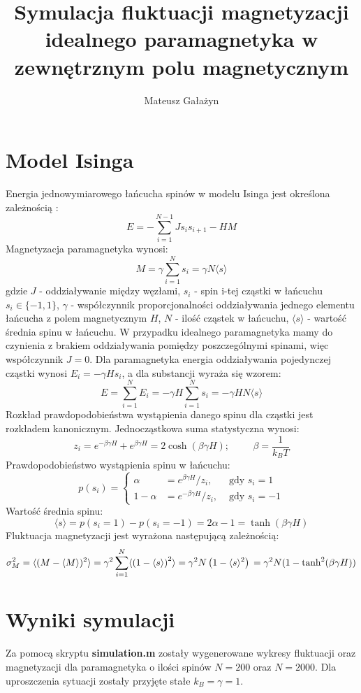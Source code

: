 \documentclass[a4paper,10pt]{article}
\author{Mateusz Gałażyn}
\title{Symulacja fluktuacji magnetyzacji idealnego paramagnetyka w zewnętrznym polu magnetycznym}
\begin{document}
	\maketitle
	\section{Model Isinga}
	Energia jednowymiarowego łańcucha spinów w modelu Isinga jest określona zależnością \cite{az}:
	\[ E = -\sum^{N-1}_{i=1} J s_{i} s_{i+1} - H M \]
	Magnetyzacja paramagnetyka wynosi:
	\[ M = \gamma \sum^{N}_{i=1}s_{i} = \gamma N \langle s \rangle \]
	gdzie $J$ - oddziaływanie między węzłami, $s_{i}$ - spin i-tej cząstki w łańcuchu $s_{i} \in \{-1,1\}$, $\gamma$ - współczynnik proporcjonalności oddziaływania jednego elementu łańcucha z polem magnetycznym $H$, $N$ - ilość cząstek w łańcuchu, $\langle s \rangle$ - wartość średnia spinu w łańcuchu. W przypadku idealnego paramagnetyka mamy do czynienia z brakiem oddziaływania pomiędzy poszczególnymi spinami, więc współczynnik $J = 0$. Dla paramagnetyka energia oddziaływania pojedynczej cząstki wynosi $E_i = - \gamma H s_{i}$, a dla substancji wyraża się wzorem:
	\[ E = \sum^{N}_{i=1} E_{i} =-\gamma H \sum^{N}_{i=1}s_{i} = -\gamma H N \langle s \rangle\]
	Rozkład prawdopodobieństwa wystąpienia danego spinu dla cząstki jest rozkładem kanonicznym. Jednocząstkowa suma statystyczna wynosi\cite{az}:
	\[ z_{i} = e^{- \beta \gamma H } + e^{\beta \gamma H} = 2 \cosh(\beta \gamma H); \hspace{1cm} \beta = \frac{1}{k_{B}T}  \]
	Prawdopodobieństwo wystąpienia spinu w łańcuchu:
	\[
	p(s_i) = \left\{ \begin{array}{lll}
	\alpha & = e^{\beta \gamma H} / z_{i}, & \mbox{ gdy } s_i = 1 \\
	1-\alpha & = e^{ -\beta \gamma H} / z_{i}, & \mbox{ gdy } s_i = -1
	\end{array} \right.
	\]
	Wartość średnia spinu:
	\[ \langle s \rangle = p(s_i=1) - p(s_i=-1) = 2 \alpha -1 = \tanh (\beta \gamma H) \]
	Fluktuacja magnetyzacji jest wyrażona następującą zależnością\cite{af}:
	\[ \sigma_{M}^{2} = \langle (M-\langle M \rangle)^{2}\rangle = \gamma^{2} \sum^{N}_{i=1} \langle \left( 1-\langle s \rangle \right)^{2} \rangle  = \gamma^{2} N  \left( 1 - \langle s \rangle^{2} \right) \\ = \gamma^{2} N (1-\tanh^{2} (\beta \gamma H)) \]
	\section{Wyniki symulacji}
	Za pomocą skryptu {\bf simulation.m } zostały wygenerowane wykresy fluktuacji oraz magnetyzacji dla paramagnetyka o ilości spinów $N=200$ oraz $N=2000$. Dla uproszczenia sytuacji zostały przyjęte stałe $k_{B}=\gamma=1$.
	
\end{document}
